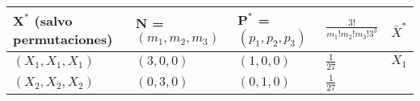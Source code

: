 \documentclass[
]{book}
\theoremstyle{definition}
\theoremstyle{definition}
\theoremstyle{definition}
\theoremstyle{remark}
\begin{document}
\begin{longtable}[]{@{}lllll@{}}
\toprule
\begin{minipage}[b]{0.18\columnwidth}\raggedright
\(\mathbf{X}^{\ast}\) (salvo permutaciones)\strut
\end{minipage} & \begin{minipage}[b]{0.16\columnwidth}\raggedright
\(\mathbf{N}\) = \(\left( m_1,m_2,m_3 \right)\)\strut
\end{minipage} & \begin{minipage}[b]{0.16\columnwidth}\raggedright
\(\mathbf{P}^{\ast}\) = \(\left(p_1,p_2,p_3 \right)\)\strut
\end{minipage} & \begin{minipage}[b]{0.17\columnwidth}\raggedright
\(\frac{3!}{m_1!m_2!m_3!3^{3}}\)\strut
\end{minipage} & \begin{minipage}[b]{0.18\columnwidth}\raggedright
\(\bar{X}^{\ast}\)\strut
\end{minipage}\tabularnewline
\midrule
\endhead
\begin{minipage}[t]{0.18\columnwidth}\raggedright
\(\left( X_1,X_1,X_1 \right)\)\strut
\end{minipage} & \begin{minipage}[t]{0.16\columnwidth}\raggedright
\(\left( 3,0,0 \right)\)\strut
\end{minipage} & \begin{minipage}[t]{0.16\columnwidth}\raggedright
\(\left(1,0,0 \right)\)\strut
\end{minipage} & \begin{minipage}[t]{0.17\columnwidth}\raggedright
\(\frac{1}{27}\)\strut
\end{minipage} & \begin{minipage}[t]{0.18\columnwidth}\raggedright
\(X_1\)\strut
\end{minipage}\tabularnewline
\begin{minipage}[t]{0.18\columnwidth}\raggedright
\(\left( X_2,X_2,X_2 \right)\)\strut
\end{minipage} & \begin{minipage}[t]{0.16\columnwidth}\raggedright
\(\left( 0,3,0 \right)\)\strut
\end{minipage} & \begin{minipage}[t]{0.16\columnwidth}\raggedright
\(\left(0,1,0 \right)\)\strut
\end{minipage} & \begin{minipage}[t]{0.17\columnwidth}\raggedright
\(\frac{1}{27}\)\strut

\end{minipage}
\end{longtable}
\end{document}
